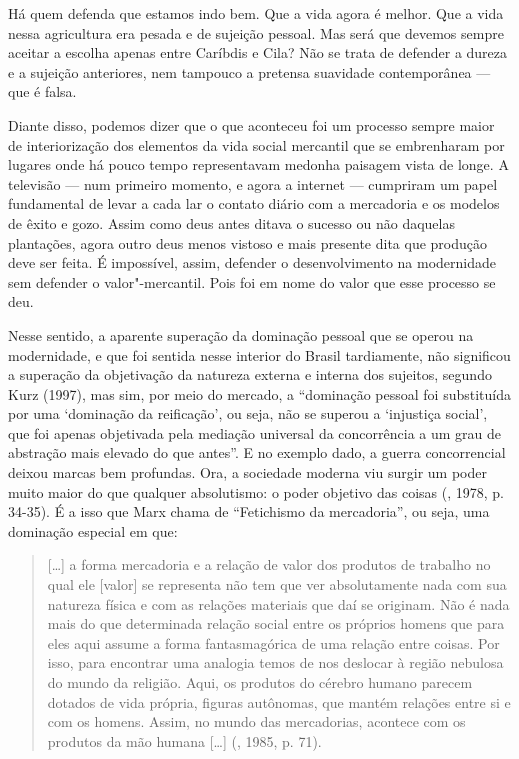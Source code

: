 Há quem defenda que estamos indo bem. Que a vida agora é melhor. Que a
vida nessa agricultura era pesada e de sujeição pessoal. Mas será que
devemos sempre aceitar a escolha apenas entre Caríbdis e Cila? Não se
trata de defender a dureza e a sujeição anteriores, nem tampouco a
pretensa suavidade contemporânea --- que é falsa.

Diante disso, podemos dizer que o que aconteceu foi um processo sempre
maior de interiorização dos elementos da vida social mercantil que se
embrenharam por lugares onde há pouco tempo representavam medonha paisagem vista de longe. A
televisão --- num primeiro momento, e agora a internet --- cumpriram um
papel fundamental de levar a cada lar o contato diário com a mercadoria
e os modelos de êxito e gozo. Assim como deus antes ditava o sucesso ou
não daquelas plantações, agora outro deus menos vistoso e mais presente
dita que produção deve ser feita. É impossível, assim, defender o
desenvolvimento na modernidade sem defender o valor"-mercantil. Pois foi
em nome do valor que esse processo se deu.

Nesse sentido, a aparente superação da dominação pessoal que se operou
na modernidade, e que foi sentida nesse interior do Brasil tardiamente,
não significou a superação da objetivação da natureza externa e interna
dos sujeitos, segundo Kurz (1997), mas sim, por meio do mercado, a
``dominação pessoal foi substituída por uma `dominação da reificação',
ou seja, não se superou a `injustiça social', que foi apenas objetivada
pela mediação universal da concorrência a um grau de abstração mais
elevado do que antes''. E no exemplo dado, a guerra concorrencial deixou
marcas bem profundas. Ora, a sociedade moderna viu surgir um poder muito
maior do que qualquer absolutismo: o poder objetivo das coisas (,
1978, p. 34-35). É a isso que Marx chama de ``Fetichismo da
mercadoria'', ou seja, uma dominação especial em que:

\begin{quote}
[\ldots{}] a forma mercadoria e a relação de valor dos produtos de
trabalho no qual ele [valor] se representa não tem que ver
absolutamente nada com sua natureza física e com as relações materiais
que daí se originam. Não é nada mais do que determinada relação social
entre os próprios homens que para eles aqui assume a forma
fantasmagórica de uma relação entre coisas. Por isso, para encontrar uma
analogia temos de nos deslocar à região nebulosa do mundo da religião.
Aqui, os produtos do cérebro humano parecem dotados de vida própria,
figuras autônomas, que mantém relações entre si e com os homens. Assim,
no mundo das mercadorias, acontece com os produtos da mão humana
[\ldots{}] (, 1985, p. 71).
\end{quote}

